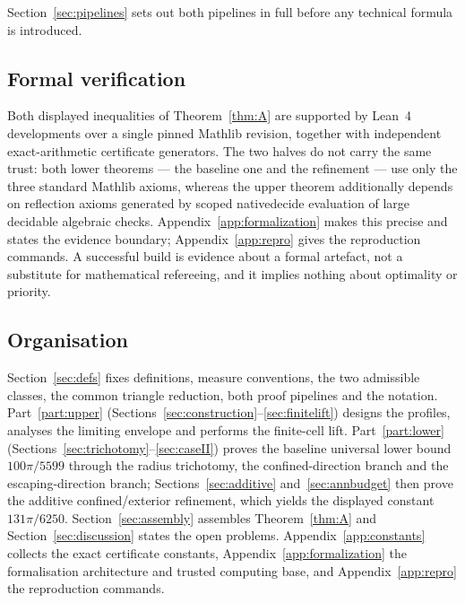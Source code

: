 \documentclass[11pt]{article}
\theoremstyle{plain}
\theoremstyle{definition}
\theoremstyle{remark}
\newcommand{\lean}[1]{%
  \begingroup\ttfamily\hyphenchar\font=-1\relax
  \def\_{\textunderscore\allowbreak}%
  #1\endgroup}
\begin{document}
Section~\ref{sec:pipelines} sets out both pipelines in full before any technical
formula is introduced.

\subsection{Formal verification}

Both displayed inequalities of Theorem~\ref{thm:A} are supported by Lean~4
developments over a single pinned Mathlib revision, together with independent
exact-arithmetic certificate generators. The two halves do not carry the same
trust: both lower theorems --- the baseline one and the refinement --- use only
the three standard Mathlib axioms, whereas the upper theorem additionally
depends on reflection axioms generated by scoped \lean{native\_decide}
evaluation of large decidable algebraic checks.
Appendix~\ref{app:formalization} makes this precise and states the evidence
boundary; Appendix~\ref{app:repro} gives the reproduction commands. A successful
build is evidence about a formal artefact, not a substitute for mathematical
refereeing, and it implies nothing about optimality or priority.

\subsection{Organisation}

Section~\ref{sec:defs} fixes definitions, measure conventions, the two
admissible classes, the common triangle reduction, both proof pipelines and the
notation. Part~\ref{part:upper}
(Sections~\ref{sec:construction}--\ref{sec:finitelift}) designs the profiles,
analyses the limiting envelope and performs the finite-cell lift.
Part~\ref{part:lower} (Sections~\ref{sec:trichotomy}--\ref{sec:caseII}) proves
the baseline universal lower bound $100\pi/5599$ through the radius trichotomy,
the confined-direction branch and the escaping-direction branch;
Sections~\ref{sec:additive} and~\ref{sec:annbudget} then prove the additive
confined/exterior refinement, which yields the displayed constant
$131\pi/6250$. Section~\ref{sec:assembly} assembles
Theorem~\ref{thm:A} and Section~\ref{sec:discussion} states the open problems.
Appendix~\ref{app:constants} collects the exact certificate constants,
Appendix~\ref{app:formalization} the formalisation architecture and trusted
computing base, and Appendix~\ref{app:repro} the reproduction commands.

\end{document}
